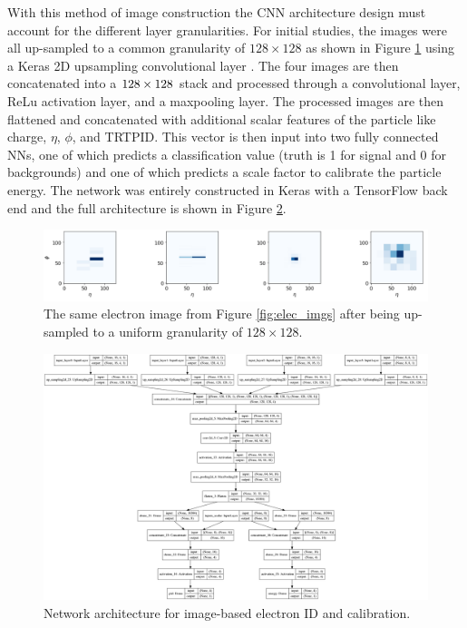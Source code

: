 With this method of image construction the CNN architecture design must account for the different layer granularities. For initial studies, the images were all up-sampled to a common granularity of $128\times128$ as shown in Figure \ref{fig:upsamp_elec_imgs} using a Keras 2D upsampling convolutional layer \cite{keras}. The four images are then concatenated into a $128\times128\time4$ stack and processed through a convolutional layer, ReLu activation layer, and a maxpooling layer. The processed images are then flattened and concatenated with additional scalar features of the particle like charge, $\eta$, $\phi$, and TRTPID. This vector is then input into two fully connected NNs, one of which predicts a classification value (truth is 1 for signal and 0 for backgrounds) and one of which predicts a scale factor to calibrate the particle energy. The network was entirely constructed in Keras with a TensorFlow \cite{tensorflow} back end and the full architecture is shown in Figure \ref{fig:elec_cnn}.\\ 

\pagebreak

\begin{figure}[htb!]
    \centering
    \includegraphics[width=5.5in]{figures/chapter5/upsamp_elec_imgs.png}
    \caption{The same electron image from Figure \ref{fig:elec_imgs} after being up-sampled to a uniform granularity of $128\times128$.}
    \label{fig:upsamp_elec_imgs}
\end{figure}

\begin{figure}[htb!]
    \centering
    \includegraphics[width=5.5in]{figures/chapter5/electron_cnn_network.png}
    \caption{Network architecture for image-based electron ID and calibration.}
    \label{fig:elec_cnn}
\end{figure}

